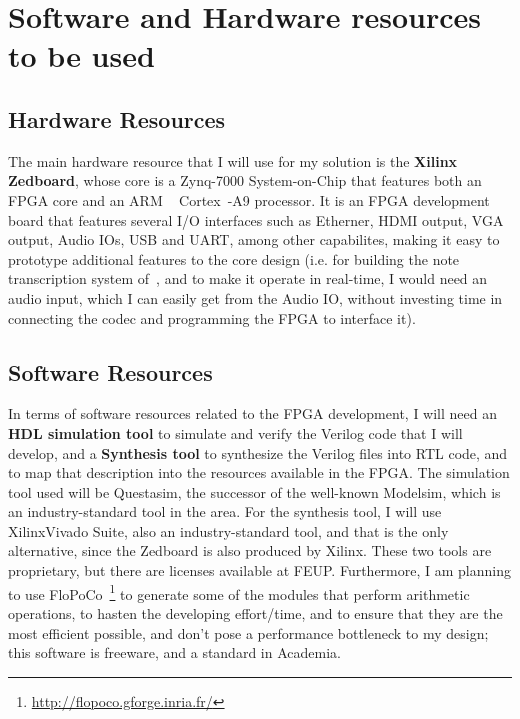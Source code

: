 \section{Software and Hardware resources to be used}\label{sec:wp_sh}

\subsection{Hardware Resources}
The main hardware resource that I will use for my solution is the \textbf{Xilinx\textregistered~ Zedboard}, whose core is a Zynq-7000 System-on-Chip that features both an FPGA core and an ARM \textregistered~ Cortex\texttrademark~-A9 processor. It is an FPGA development board that features several I/O interfaces such as Etherner, HDMI output, VGA output, Audio IOs, USB and UART, among other capabilites, making it easy to prototype additional features to the core design (i.e. for building the note transcription system of~\cite{Bock12}, and to make it operate in real-time, I would need an audio input, which I can easily get from the Audio IO, without investing time in connecting the codec and programming the FPGA to interface it).

\subsection{Software Resources}
In terms of software resources related to the FPGA development, I will need an \textbf{HDL simulation tool} to simulate and verify the Verilog code that I will develop, and a \textbf{Synthesis tool} to synthesize the Verilog files into RTL code, and to map that description into the resources available in the FPGA. The simulation tool used will be Questasim\texttrademark, the successor of the well-known Modelsim\texttrademark, which is an industry-standard tool in the area. For the synthesis tool, I will use Xilinx\textregistered Vivado Suite, also an industry-standard tool, and that is the only alternative, since the Zedboard is also produced by Xilinx\textregistered. These two tools are proprietary, but there are licenses available at FEUP. Furthermore, I am planning to use FloPoCo~\footnote{\href{http://flopoco.gforge.inria.fr/}{http://flopoco.gforge.inria.fr/}} to generate some of the modules that perform arithmetic operations, to hasten the developing effort/time, and to ensure that they are the most efficient possible, and don't pose a performance bottleneck to my design; this software is freeware, and a standard in Academia.

